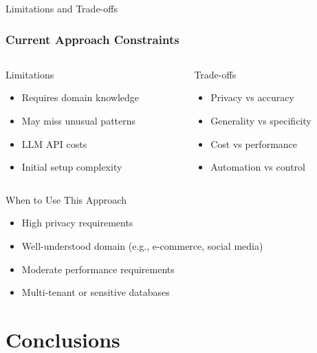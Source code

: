 \documentclass{beamer}
\begin{document}
\begin{frame}{Limitations and Trade-offs}
\frametitle{Current Approach Constraints}

\begin{columns}[T]
\begin{column}{0.5\textwidth}
\begin{block}{Limitations}
\begin{itemize}
    \item Requires domain knowledge
    \item May miss unusual patterns
    \item LLM API costs
    \item Initial setup complexity
\end{itemize}
\end{block}
\end{column}

\begin{column}{0.5\textwidth}
\begin{block}{Trade-offs}
\begin{itemize}
    \item Privacy vs accuracy
    \item Generality vs specificity
    \item Cost vs performance
    \item Automation vs control
\end{itemize}
\end{block}
\end{column}
\end{columns}

\vspace{0.5cm}

\begin{exampleblock}{When to Use This Approach}
\begin{itemize}
    \item High privacy requirements
    \item Well-understood domain (e.g., e-commerce, social media)
    \item Moderate performance requirements
    \item Multi-tenant or sensitive databases
\end{itemize}
\end{exampleblock}

\end{frame}

\section{Conclusions}
\end{document}
